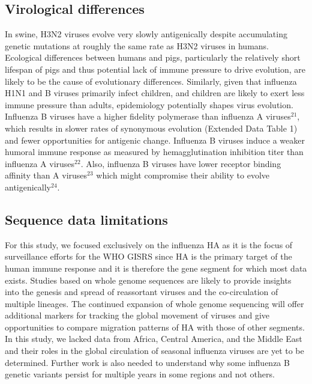 \documentclass[11pt,oneside,letterpaper]{article}
\begin{document}
\subsection*{Virological differences}

In swine, H3N2 viruses evolve very slowly antigenically despite accumulating genetic mutations at roughly the same rate as H3N2 viruses in humans\cite{deJong07}.
Ecological differences between humans and pigs, particularly the relatively short lifespan of pigs and thus potential lack of immune pressure to drive evolution, are likely to be the cause of evolutionary differences.
Similarly, given that influenza H1N1 and B viruses primarily infect children, and children are likely to exert less immune pressure than adults, epidemiology potentially shapes virus evolution.
Influenza B viruses have a higher fidelity polymerase than influenza A viruses$^{21}$, which results in slower rates of synonymous evolution (Extended Data Table 1) and fewer opportunities for antigenic change.
Influenza B viruses induce a weaker humoral immune response as measured by hemagglutination inhibition titer than influenza A viruses$^{22}$.
Also, influenza B viruses have lower receptor binding affinity than A viruses$^{23}$ which might compromise their ability to evolve antigenically$^{24}$.

\subsection*{Sequence data limitations}

For this study, we focused exclusively on the influenza HA as it is the focus of surveillance efforts for the WHO GISRS since HA is the primary target of the human immune response and it is therefore the gene segment for which most data exists.
Studies based on whole genome sequences are likely to provide insights into the genesis and spread of reassortant viruses and the co-circulation of multiple lineages.
The continued expansion of whole genome sequencing will offer additional markers for tracking the global movement of viruses and give opportunities to compare migration patterns of HA with those of other segments.
In this study, we lacked data from Africa, Central America, and the Middle East and their roles in the global circulation of seasonal influenza viruses are yet to be determined.
Further work is also needed to understand why some influenza B genetic variants persist for multiple years in some regions and not others.



\end{document}
